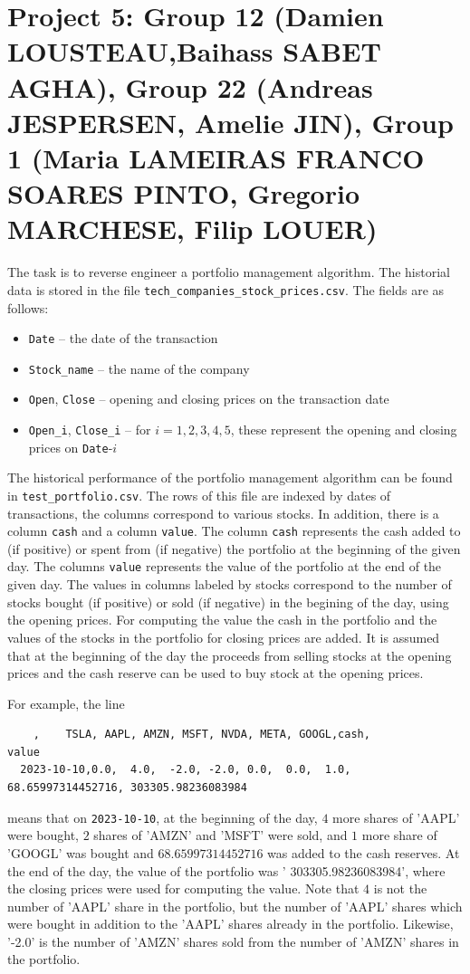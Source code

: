 \documentclass{article}
\begin{document}
\section*{Project 5:  Group 12 (Damien LOUSTEAU,Baihass SABET AGHA),  Group 22 (Andreas	JESPERSEN, Amelie JIN), Group 1 (Maria LAMEIRAS FRANCO SOARES PINTO, Gregorio MARCHESE, Filip LOUER)}
   The task is to reverse engineer a portfolio management algorithm. 
   The historial  data is stored in the file \lstinline$tech_companies_stock_prices.csv$. The fields are as follows:
\begin{itemize} \item \lstinline$Date$ -- the date of the transaction 
\item \lstinline$Stock_name$ -- the name of the company 
\item \lstinline$Open$, \lstinline$Close$ -- opening and closing prices on the transaction date 
\item \lstinline$Open_i$, \lstinline$Close_i$ -- for $i=1,2,3,4,5$, these represent the opening and closing prices on \lstinline$Date$-$i$ 
\end{itemize}

The historical performance of the portfolio management algorithm can be found in \lstinline$test_portfolio.csv$. 
The rows of this file are indexed by dates of transactions, the columns correspond to various stocks. In addition, there is a 
column \lstinline$cash$ and a column \lstinline$value$. The column \lstinline$cash$ represents the cash added to  (if positive) or spent from (if negative) the portfolio at
the beginning of the given day. The columns \lstinline$value$ represents the value of the portfolio at the end of the given day.
The values in columns labeled by stocks correspond to the number of stocks bought (if positive) or sold (if negative) in the 
begining of the day, using the opening prices. For computing the value the cash in the portfolio and the values of the stocks in the
portfolio for closing prices are added. 
It is assumed that at the beginning of the day the proceeds from selling stocks at the opening prices and the cash reserve 
can be used to buy stock at the opening prices. 

For example, the line
\begin{lstlisting}
	,    TSLA, AAPL, AMZN, MSFT, NVDA, META, GOOGL,cash,               value
  2023-10-10,0.0,  4.0,  -2.0, -2.0, 0.0,  0.0,  1.0,   68.65997314452716, 303305.98236083984
\end{lstlisting}
means that on \lstinline$2023-10-10$, at the beginning of the day, $4$ more shares of 'AAPL' were bought, $2$ shares of 'AMZN' and 'MSFT' were
sold, and $1$ more share of 'GOOGL' was bought and $68.65997314452716$ was added to the cash reserves. At the end of the day,
the value of the portfolio was ' 303305.98236083984', where the closing prices were used for computing the value.
Note that $4$ is not the number of 'AAPL' share in the portfolio, but the number of 'AAPL' shares which were bought in addition to
the 'AAPL' shares already in the portfolio. Likewise, '-2.0' is the number of 'AMZN' shares sold from the number of 'AMZN' shares in
the portfolio. 
\end{document}
